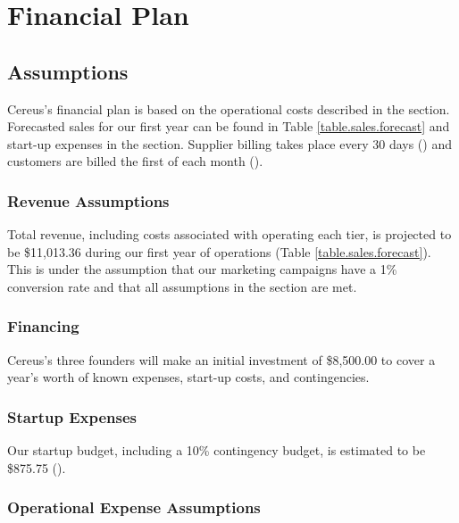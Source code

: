 {\let\cleardoublepage\relax \chapter*{Financial Plan}}

\section{Assumptions}

Cereus's financial plan is based on the operational costs described in the  section. Forecasted sales for our first year can be found in Table \ref{table.sales.forecast} and start-up expenses in the  section. Supplier billing takes place every 30 days () and customers are billed the first of each month ().

\subsection{Revenue Assumptions}

Total revenue, including costs associated with operating each tier, is projected to be \$11,013.36 during our first year of operations (Table \ref{table.sales.forecast}). This is under the assumption that our marketing campaigns have a 1\% conversion rate and that all assumptions in the  section are met.

\subsection{Financing}

Cereus's three founders will make an initial investment of \$8,500.00 to cover a year's worth of known expenses, start-up costs, and contingencies.

\subsection{Startup Expenses}

Our startup budget, including a 10\% contingency budget, is estimated to be \$875.75 ().

\subsection{Operational Expense Assumptions}

